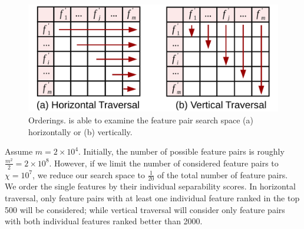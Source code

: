 
\begin{figure}[h]
 \centering
 \vspace{-5mm}
 \includegraphics[width=0.85\linewidth]{fig/traversal.pdf}
 \vspace{-5mm}
\caption{\traversal Orderings. \genviz is able to examine the feature pair search space (a) horizontally or (b) vertically.}
\vspace{-5mm}
\label{fig:traversal}
\end{figure}

\begin{example}[\traversal]
Assume $m=2\times 10^4$. Initially, the number of possible feature pairs is roughly $\frac{m^2}{2}=2\times 10^8$. However, if we limit the number of considered feature pairs to $\chi=10^7$, we reduce our search space to $\frac{1}{20}$ of the total number of feature pairs. We order the single features by their individual separability scores. In horizontal traversal, only feature pairs with at least one individual feature ranked in the top 500 will be considered; while vertical traversal will consider only feature pairs with both individual features ranked better than 2000.
\label{examp:traversal}
\end{example}


